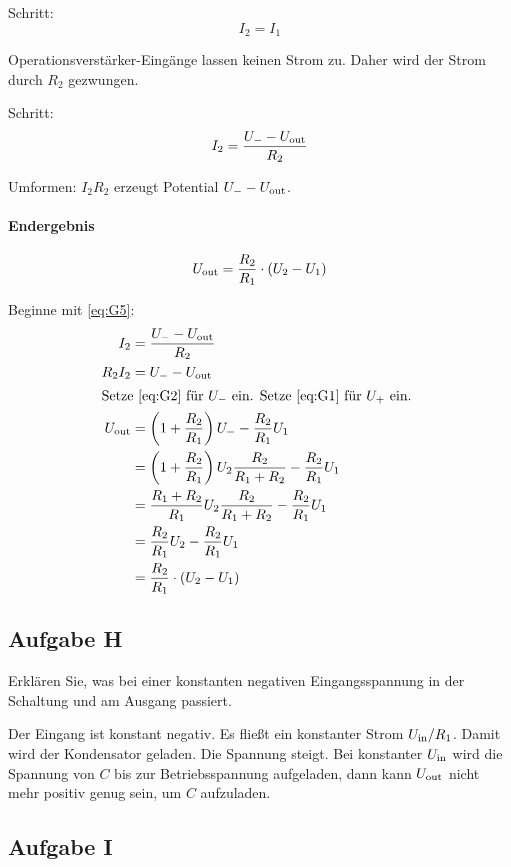 Schritt:
\begin{equation}
	\label{eq:G4}
	I_2 = I_1
\end{equation}

Operationsverstärker-Eingänge lassen keinen Strom zu. Daher wird der Strom
durch $R_2$ gezwungen.

Schritt:
\begin{equation}
	\label{eq:G5}
	I_2 = \frac{U_- - U_\text{out}}{R_2}
\end{equation}

Umformen: $I_2 R_2$ erzeugt Potential $U_- - U_\text{out}$.

\paragraph{Endergebnis}
\[
	U_\text{out} = \frac{R_2}{R_1} \cdot (U_2 - U_1)
\]

Beginne mit \eqref{eq:G5}:
\begin{align*}
	I_2 &= \frac{U_- - \Uout}{R_2} \\
	R_2 I_2 &= U_- - \Uout \\
	\intertext{%
		Setze \eqref{eq:G2} für $U_-$ ein. Setze \eqref{eq:G1} für $U_+$ ein.
	}
	\Uout
	&= \del{1 + \frac{R_2}{R_1}} U_- - \frac{R_2}{R_1} U_1 \\
	&= \del{1 + \frac{R_2}{R_1}} U_2 \frac{R_2}{R_1 + R_2} - \frac{R_2}{R_1} U_1 \\
	&= \frac{R_1 + R_2}{R_1} U_2 \frac{R_2}{R_1 + R_2} - \frac{R_2}{R_1} U_1 \\
	&= \frac{R_2}{R_1} U_2 - \frac{R_2}{R_1} U_1 \\
	&= \frac{R_2}{R_1} \cdot (U_2 - U_1)
\end{align*}

\subsection{Aufgabe H}

\begin{problem}
	Erklären Sie, was bei einer konstanten negativen Eingangsspannung in der
	Schaltung und am Ausgang passiert.
\end{problem}

Der Eingang ist konstant negativ. Es fließt ein konstanter Strom $U_\text{in}/R_1$.
Damit wird der Kondensator geladen. Die Spannung steigt. Bei konstanter $U_\text{in}$
wird die Spannung von $C$ bis zur Betriebsspannung aufgeladen, dann kann
$U_\text{out}$ nicht mehr positiv genug sein, um $C$ aufzuladen.

\subsection{Aufgabe I}

